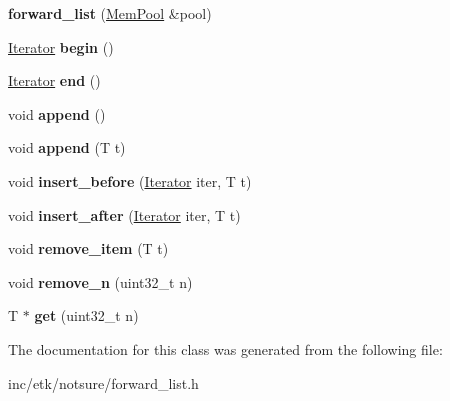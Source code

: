 \begin{DoxyCompactItemize}
\item 
\hypertarget{classetk_1_1forward__list_ab3b554a64217a9895552974788a9d9f5}{{\bfseries forward\-\_\-list} (\hyperlink{classetk_1_1_mem_pool}{Mem\-Pool} \&pool)}\label{classetk_1_1forward__list_ab3b554a64217a9895552974788a9d9f5}

\item 
\hypertarget{classetk_1_1forward__list_a20da22c1b8a3b166483b6a99c197dcb5}{\hyperlink{classetk_1_1forward__list_1_1_iterator}{Iterator} {\bfseries begin} ()}\label{classetk_1_1forward__list_a20da22c1b8a3b166483b6a99c197dcb5}

\item 
\hypertarget{classetk_1_1forward__list_a58604866c050722b0c8f76a669a637b7}{\hyperlink{classetk_1_1forward__list_1_1_iterator}{Iterator} {\bfseries end} ()}\label{classetk_1_1forward__list_a58604866c050722b0c8f76a669a637b7}

\item 
\hypertarget{classetk_1_1forward__list_aa667c79ebdde0459c07329bc0af854da}{void {\bfseries append} ()}\label{classetk_1_1forward__list_aa667c79ebdde0459c07329bc0af854da}

\item 
\hypertarget{classetk_1_1forward__list_a48211fca8a7a0b11bdaf540ab15cb10d}{void {\bfseries append} (T t)}\label{classetk_1_1forward__list_a48211fca8a7a0b11bdaf540ab15cb10d}

\item 
\hypertarget{classetk_1_1forward__list_afe0c747b46a995f16faa722718a7fa11}{void {\bfseries insert\-\_\-before} (\hyperlink{classetk_1_1forward__list_1_1_iterator}{Iterator} iter, T t)}\label{classetk_1_1forward__list_afe0c747b46a995f16faa722718a7fa11}

\item 
\hypertarget{classetk_1_1forward__list_a76887e7cfc71bba2cfc76d7ab88283c0}{void {\bfseries insert\-\_\-after} (\hyperlink{classetk_1_1forward__list_1_1_iterator}{Iterator} iter, T t)}\label{classetk_1_1forward__list_a76887e7cfc71bba2cfc76d7ab88283c0}

\item 
\hypertarget{classetk_1_1forward__list_a305bb56b6e1dd14283f8e2ba73425454}{void {\bfseries remove\-\_\-item} (T t)}\label{classetk_1_1forward__list_a305bb56b6e1dd14283f8e2ba73425454}

\item 
\hypertarget{classetk_1_1forward__list_a27f7405c0e70206675467a3716d5ed2a}{void {\bfseries remove\-\_\-n} (uint32\-\_\-t n)}\label{classetk_1_1forward__list_a27f7405c0e70206675467a3716d5ed2a}

\item 
\hypertarget{classetk_1_1forward__list_ac9cf28b3334e4a62b8c6b0c4d28eae2b}{T $\ast$ {\bfseries get} (uint32\-\_\-t n)}\label{classetk_1_1forward__list_ac9cf28b3334e4a62b8c6b0c4d28eae2b}

\end{DoxyCompactItemize}


The documentation for this class was generated from the following file\-:\begin{DoxyCompactItemize}
\item 
inc/etk/notsure/forward\-\_\-list.\-h\end{DoxyCompactItemize}
